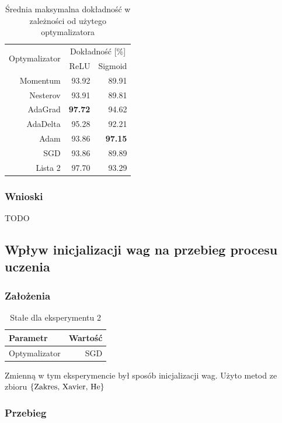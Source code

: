\documentclass{article}
\begin{document}
\begin{table}[H]
	\caption{Średnia maksymalna dokładność w zależności od użytego optymalizatora}
	\label{tabela-res-11}
	\centering
	\begin{tabular}{rrr}
		\toprule
		\multirow{2}{*}{Optymalizator} & \multicolumn{2}{c}{Dokładność [\%]} \\
		         & ReLU           & Sigmoid        \\
		\midrule
		Momentum & 93.92          & 89.91          \\
		Nesterov & 93.91          & 89.81          \\
		AdaGrad  & \textbf{97.72} & 94.62          \\
		AdaDelta & 95.28          & 92.21          \\
		Adam     & 93.86          & \textbf{97.15} \\
		SGD      & 93.86          & 89.89          \\
		Lista 2  & 97.70          & 93.29          \\
		\bottomrule
	\end{tabular}
\end{table}

\subsubsection*{Wnioski}

TODO

\newpage
\subsection{Wpływ inicjalizacji wag na przebieg procesu uczenia}
\subsubsection*{Założenia}
\begin{table}[H]
	\caption{Stałe dla eksperymentu 2}
	\label{tabela-const-2}
	\centering
	\begin{tabular}{lr}
		\toprule
		Parametr      & Wartość \\
		\midrule
		Optymalizator & SGD       \\
		\bottomrule
	\end{tabular}
\end{table}

Zmienną w tym eksperymencie był sposób inicjalizacji wag. Użyto metod ze zbioru \(\{$Zakres, Xavier, He$\}\)
\subsubsection*{Przebieg}
\end{document}

